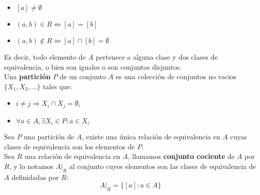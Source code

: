 \documentclass[11pt,a4paper]{article}
\begin{document}
\begin{itemize}
\item $[a] \not = \emptyset$
\item $(a,b) \in R \iff [a]=[b]$
\item $(a,b) \not \in R \iff [a]\cap[b] = \emptyset$
\end{itemize}

Es decir, todo elemento de $A$ pertenece a alguna clase y dos clases de equivalencia, o bien son iguales o son conjuntos disjuntos.\\

Una \textbf{partici\'on} $P$ de un conjunto $A$ es una colecci\'on de conjuntos no vacios $\{ X_1, X_2, ...\}$ tales que:
\begin{itemize}
\item $i \not = j \Rightarrow X_i \cap X_j = \emptyset$,
\item $\forall a \in A, \exists X_i \in P : a \in X_i$
\end{itemize}

Sea $P$ una partici\'on de $A$, existe una \'unica relaci\'on de equivalencia en $A$ cuyas clases de equivalencia son los elementos de $P$.\\

Sea $R$ una relaci\'on de equivalencia en $A$, llamamos \textbf{conjunto cociente} de $A$ por $R$, y lo notamos $A|_R$ al conjunto cuyos elementos son las clases de equivalencia de $A$ definidadas por $R$: $$A|_R = \{ [a] : a \in A \}$$
\end{document}
